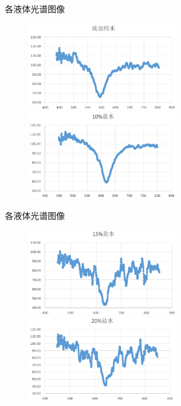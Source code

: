 \documentclass{beamer}
\begin{document}
\begin{frame}{各液体光谱图像}
  \begin{figure}[htbp]
    \centering
    \begin{minipage}[htbp]{180pt}
      \centering
      \includegraphics[width=180pt]{images/3_1.png}
    \end{minipage}
    \hspace{10pt}%
    \begin{minipage}[htpb]{180pt}
      \centering
      \includegraphics[width=180pt]{images/3_2.png}
    \end{minipage}
    \end{figure}
\end{frame}
\begin{frame}{各液体光谱图像}
  \begin{figure}[htbp]
    \centering
    \begin{minipage}[htbp]{180pt}
      \centering
      \includegraphics[width=180pt]{images/3_3.png}
    \end{minipage}
    \hspace{10pt}%
    \begin{minipage}[htpb]{180pt}
      \centering
      \includegraphics[width=180pt]{images/3_4.png}
    \end{minipage}
    \end{figure}
\end{frame}
\end{document}
